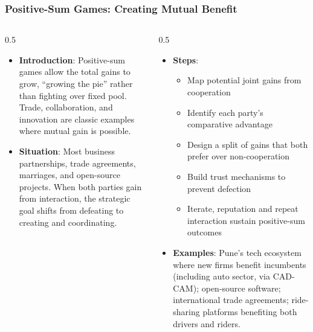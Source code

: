 \begin{frame}[fragile]\frametitle{Positive-Sum Games: Creating Mutual Benefit}
\begin{columns}
    \begin{column}[T]{0.5\linewidth}
      \begin{itemize}
        \item \textbf{Introduction}: Positive-sum games allow the total gains to grow, ``growing the pie'' rather than fighting over fixed pool. Trade, collaboration, and innovation are classic examples where mutual gain is possible.
        \item \textbf{Situation}: Most business partnerships, trade agreements, marriages, and open-source projects. When both parties gain from interaction, the strategic goal shifts from defeating to creating and coordinating.
      \end{itemize}
    \end{column}
    \begin{column}[T]{0.5\linewidth}
      \begin{itemize}
        \item \textbf{Steps}:
        \begin{itemize}
          \item Map potential joint gains from cooperation
          \item Identify each party's comparative advantage
          \item Design a split of gains that both prefer over non-cooperation
          \item Build trust mechanisms to prevent defection
          \item Iterate, reputation and repeat interaction sustain positive-sum outcomes
        \end{itemize}\item \textbf{Examples}: Pune's tech ecosystem where new firms benefit incumbents (including auto sector, via CAD-CAM); open-source software; international trade agreements; ride-sharing platforms benefiting both drivers and riders.
      \end{itemize}
    \end{column}
  \end{columns}
\end{frame}


